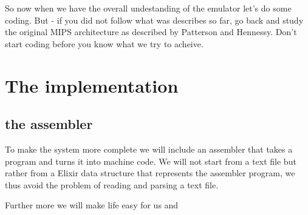 \documentclass[a4paper,11pt]{article}
\begin{document}
So now when we have the overall undestanding of the emulator let's do
some coding. But - if you did not follow what was describes so far, go
back and study the original MIPS architecture as described by
Patterson and Hennessy. Don't start coding before you know what we try
to acheive.


\section{The implementation}



\subsection*{the assembler }

To make the system more complete we will include an
assembler that takes a program and turns it into machine code. We will
not start from a text file but rather from a Elixir data structure
that represents the assembler program, we thus avoid the problem of
reading and parsing a text file.

Further more we will make life easy for us and 
\end{document}

